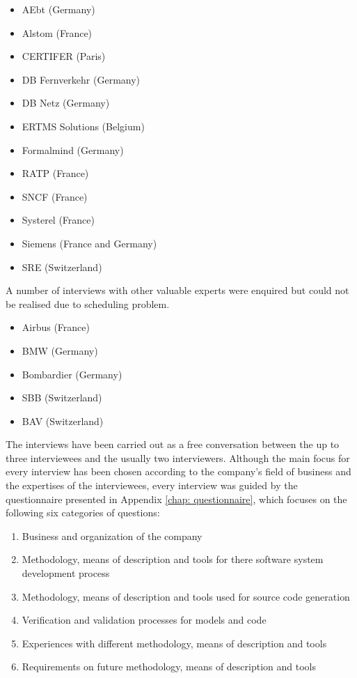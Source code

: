 \documentclass{./template/openetcs2}
\begin{document}
\vspace{-10pt}
\begin{itemize}[topsep=2pt, partopsep=2pt,itemsep=2pt,parsep=2pt]
  \item AEbt (Germany)
  \item Alstom (France)  
  \item CERTIFER (Paris)
  \item DB Fernverkehr (Germany)
  \item DB Netz (Germany)
  \item ERTMS Solutions (Belgium)
  \item Formalmind (Germany)
  \item RATP (France)
  \item SNCF (France)
  \item Systerel (France)
  \item Siemens (France and Germany)
  \item SRE (Switzerland)
\end{itemize}

A number of interviews with other valuable experts were enquired but could not be realised due to scheduling problem.


\vspace{-10pt}
\begin{itemize} [topsep=2pt, partopsep=2pt,itemsep=2pt,parsep=2pt]
  \item Airbus (France)
  \item BMW (Germany)
  \item Bombardier (Germany)
  \item SBB (Switzerland)
  \item BAV (Switzerland)
\end{itemize}

The interviews have been carried out as a free conversation between the up to three interviewees and the usually two interviewers. Although the main focus for every interview has been chosen according to the company's field of business and the expertises of the interviewees, every interview was guided by the questionnaire presented in Appendix \ref{chap: questionnaire}, which focuses on the following six categories of questions:

\vspace{-10pt}
\begin{enumerate}[topsep=2pt, partopsep=2pt,itemsep=2pt,parsep=2pt]

	\renewcommand{\theenumi}{\Alph{enumi}}
	\renewcommand{\labelenumi}{\theenumi}

  \item Business and organization of the company
  \item Methodology, means of description and tools for there software system development process
  \item Methodology, means of description and tools used for source code generation
  \item Verification and validation processes for models and code
  \item Experiences with different methodology, means of description and tools
  \item Requirements on future methodology, means of description and tools
\end{enumerate}
\end{document}
